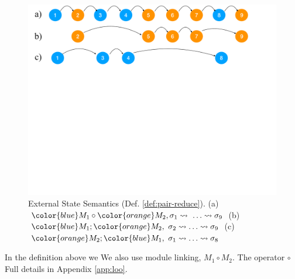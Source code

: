 \begin{figure}[htb]
  \vspace*{-2.5mm}
  \begin{center}
   \begin{minipage}{0.80\textwidth}
     \begin{center}
       \includegraphics[width=\linewidth]{diagrams/VisibleStates.pdf}
     \end{center}
   \end{minipage}
   \end{center}
   \vspace*{-2.5mm}
   \caption{External State Semantics
     (Def. \ref{def:pair-reduce}). %
     (a) $\exec{{\color{blue}M_1} \circ {\color{orange}M_2}}{\sigma_1}{\ldots}\leadsto \sigma_9$
     (b) $\reduction{{\color{blue}M_1}}{{\color{orange}M_2}}{\sigma_2}{\ldots}\leadsto \sigma_9$
     (c) $\reduction{{\color{orange}M_2}}{{\color{blue}M_1}}{\sigma_1}{\ldots}\leadsto \sigma_8$
    }
   \label{fig:VisibleStates}
 \end{figure}



In the  definition above %
we  
We also use module linking, $M_1\circ M_2$. The operator $\circ$
Full details in  Appendix \ref{app:loo}.



